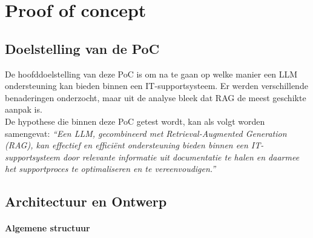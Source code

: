 \chapter{Proof of concept}
\label{ch:proof-of-concept}

\section{Doelstelling van de PoC}

De hoofddoelstelling van deze PoC is om na te gaan op welke manier een LLM ondersteuning kan bieden binnen een IT-supportsysteem. Er werden verschillende benaderingen onderzocht, maar uit de analyse bleek dat RAG de meest geschikte aanpak is. 
\\[1em]
De hypothese die binnen deze PoC getest wordt, kan als volgt worden samengevat:
\textit{“Een LLM, gecombineerd met Retrieval-Augmented Generation (RAG), kan effectief en efficiënt ondersteuning bieden binnen een IT-supportsysteem door relevante informatie uit documentatie te halen en daarmee het supportproces te optimaliseren en te vereenvoudigen.”}
\section{Architectuur en Ontwerp}


\subsubsection{Algemene structuur}

